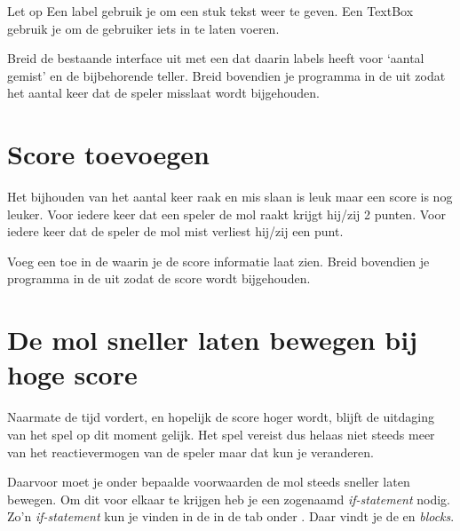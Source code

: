 \begin{derivation}{Let op}
Een label gebruik je om een stuk tekst weer te geven.
Een TextBox gebruik je om de gebruiker iets in te laten voeren.
\end{derivation}

\begin{opgave}
    \opgVraag
	Breid de bestaande interface uit met een  dat daarin labels heeft voor `aantal gemist' en de bijbehorende teller. Breid bovendien je programma in de  uit zodat het aantal keer dat de speler misslaat wordt bijgehouden. 
\end{opgave}


\section{Score toevoegen}
Het bijhouden van het aantal keer raak en mis slaan is leuk maar een score is nog leuker. Voor iedere keer dat een speler de mol raakt krijgt hij/zij 2 punten. Voor iedere keer dat de speler de mol mist verliest hij/zij een punt. 

\begin{opgave}
    \opgVraag
	Voeg een  toe in de  waarin je de score informatie laat zien. Breid bovendien je programma in de  uit zodat de score wordt bijgehouden. 
\end{opgave}


\section{De mol sneller laten bewegen bij hoge score}
Naarmate de tijd vordert, en hopelijk de score hoger wordt, blijft de uitdaging van het spel op dit moment gelijk. Het spel vereist dus helaas niet steeds meer van het reactievermogen van de speler maar dat kun je veranderen.

Daarvoor moet je onder bepaalde voorwaarden de mol steeds sneller laten bewegen. Om dit voor elkaar te krijgen heb je een zogenaamd \emph{if-statement} nodig. Zo'n \emph{if-statement} kun je vinden in de  in de tab  onder . Daar vindt je de  en  \emph{blocks}.

